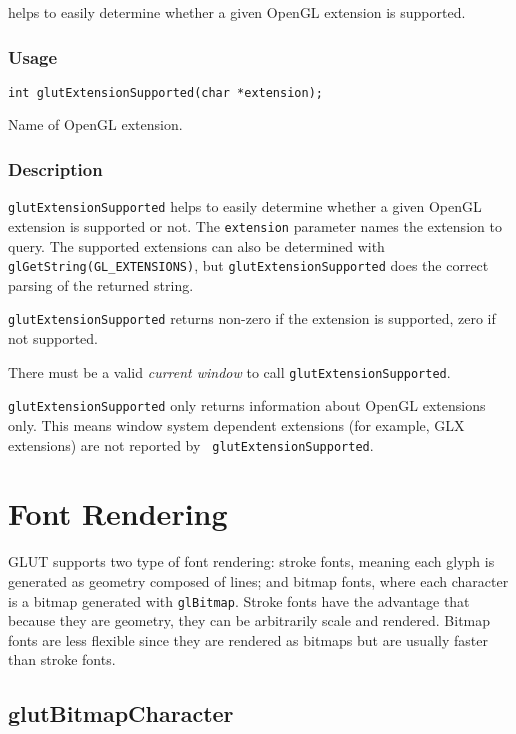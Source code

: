  helps to easily determine whether a given
OpenGL extension is supported.

\subsubsection*{Usage}
\begin{verbatim}
int glutExtensionSupported(char *extension);
\end{verbatim}
\begin{description}
\itemsep 0in
\item[\tt extension]
Name of OpenGL extension.
\end{description}

\subsubsection*{Description}

{\tt glutExtensionSupported} helps to easily determine whether a given
OpenGL extension is supported or not.  The {\tt extension} parameter
names the extension to query.  The supported extensions can also be
determined with {\tt glGetString(GL\_EXTENSIONS)}, but {\tt glutExtensionSupported}
does the correct parsing of the returned string.

{\tt glutExtensionSupported} returns non-zero if the extension is supported,
zero if not supported.

There must be a valid {\em current window} to call {\tt glutExtensionSupported}.

{\tt glutExtensionSupported} only returns information about OpenGL
extensions only.  This means window system dependent extensions (for
example, GLX extensions) are not reported by {\tt
glutExtensionSupported}.

\section{Font Rendering}

GLUT supports two type of font rendering:  stroke fonts,
meaning each glyph is generated as geometry
composed of lines; and bitmap fonts, where each character
is a bitmap generated with {\tt glBitmap}.  Stroke fonts have
the advantage that because they are geometry, they can
be arbitrarily scale and rendered.  Bitmap fonts are
less flexible since they are rendered as bitmaps but are
usually faster than stroke fonts.

\subsection{glutBitmapCharacter}

